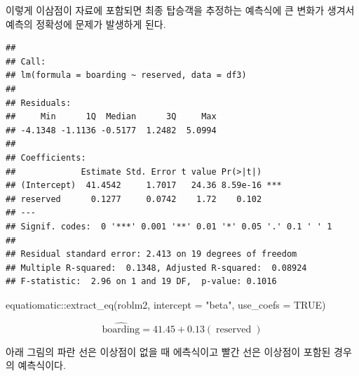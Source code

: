 \documentclass[
  10pt,
]{book}
\newenvironment{Shaded}{\begin{snugshade}}{\end{snugshade}}
\newcommand{\AttributeTok}[1]{\textcolor[rgb]{0.77,0.63,0.00}{#1}}
\newcommand{\ConstantTok}[1]{\textcolor[rgb]{0.00,0.00,0.00}{#1}}
\newcommand{\FunctionTok}[1]{\textcolor[rgb]{0.00,0.00,0.00}{#1}}
\newcommand{\NormalTok}[1]{#1}
\newcommand{\OtherTok}[1]{\textcolor[rgb]{0.56,0.35,0.01}{#1}}
\newcommand{\SpecialCharTok}[1]{\textcolor[rgb]{0.00,0.00,0.00}{#1}}
\newcommand{\StringTok}[1]{\textcolor[rgb]{0.31,0.60,0.02}{#1}}
\theoremstyle{definition}
\theoremstyle{definition}
\theoremstyle{definition}
\theoremstyle{definition}
\theoremstyle{remark}
\begin{document}
이렇게 이삼점이 자료에 포함되면 최종 탑승객을 추정하는 예측식에 큰 변화가 생겨서 예측의 정확성에 문제가 발생하게 된다.

\begin{Shaded}
\end{Shaded}

\begin{verbatim}
## 
## Call:
## lm(formula = boarding ~ reserved, data = df3)
## 
## Residuals:
##     Min      1Q  Median      3Q     Max 
## -4.1348 -1.1136 -0.5177  1.2482  5.0994 
## 
## Coefficients:
##             Estimate Std. Error t value Pr(>|t|)    
## (Intercept)  41.4542     1.7017   24.36 8.59e-16 ***
## reserved      0.1277     0.0742    1.72    0.102    
## ---
## Signif. codes:  0 '***' 0.001 '**' 0.01 '*' 0.05 '.' 0.1 ' ' 1
## 
## Residual standard error: 2.413 on 19 degrees of freedom
## Multiple R-squared:  0.1348, Adjusted R-squared:  0.08924 
## F-statistic:  2.96 on 1 and 19 DF,  p-value: 0.1016
\end{verbatim}

\begin{Shaded}
\begin{Highlighting}[]
\NormalTok{equatiomatic}\SpecialCharTok{::}\FunctionTok{extract\_eq}\NormalTok{(roblm2, }\AttributeTok{intercept =} \StringTok{"beta"}\NormalTok{,  }\AttributeTok{use\_coefs =} \ConstantTok{TRUE}\NormalTok{)}
\end{Highlighting}
\end{Shaded}

\[
\operatorname{\widehat{boarding}} = 41.45 + 0.13(\operatorname{reserved})
\]

아래 그림의 파란 선은 이상점이 없을 때 에측식이고 빨간 선은 이상점이 포함된 경우의 예측식이다.
\end{document}
